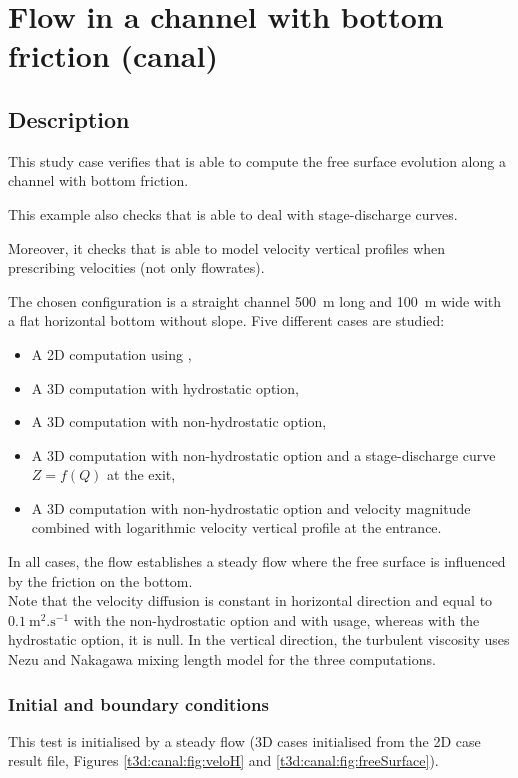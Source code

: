 \chapter{Flow in a channel with bottom friction (canal)}

\section{Description}
\bigskip
This study case verifies that  is able to compute the free
surface evolution along a channel with bottom friction.

This example also checks that  is able to deal with stage-discharge
curves.

Moreover, it checks that  is able to model velocity vertical
profiles when prescribing velocities (not only flowrates).

\bigskip
The chosen configuration is a straight channel 500~m long and 100~m wide
with a flat horizontal bottom without slope.
Five different cases are studied:
\begin{itemize}
\item A 2D computation using ,
\item A 3D computation with hydrostatic option,
\item A 3D computation with non-hydrostatic option,
\item A 3D computation with non-hydrostatic option and
a stage-discharge curve $Z = f(Q)$ at the exit,
\item A 3D computation with non-hydrostatic option and velocity magnitude
combined with logarithmic velocity vertical profile at the entrance.
\end{itemize}
In all cases, the flow establishes a steady flow where the free surface
is influenced by the friction on the bottom. \\
Note that the velocity diffusion is constant in horizontal direction
and equal to $0.1~\text{m}^2.\text{s}^{-1}$ with the non-hydrostatic 
option and with  usage, whereas with the hydrostatic option, 
it is null. In the vertical direction, the turbulent viscosity uses 
Nezu and Nakagawa mixing length model for the three  computations.

\subsection{Initial and boundary conditions}

\bigskip
This test is initialised by a steady flow (3D cases initialised 
from the 2D case result file, Figures 
\ref{t3d:canal:fig:veloH} and \ref{t3d:canal:fig:freeSurface}).

